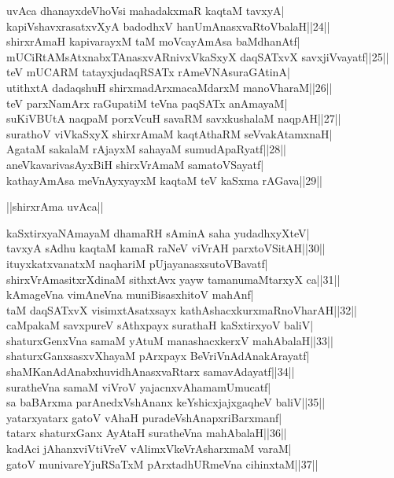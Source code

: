 \documentclass{article}
\begin{document}
uvAca dhanayxdeVhoVsi mahadakxmaR kaqtaM tavxyA|\\
kapiVshavxrasatxvXyA badodhxV hanUmAnasxvaRtoVbalaH||24||\\
shirxrAmaH kapivarayxM taM moVcayAmAsa baMdhanAtf|\\
mUCiRtAMsAtxnabxTAnasxvARnivxVkaSxyX daqSATxvX savxjiVvayatf||25||\\
teV mUCARM tatayxjudaqRSATx rAmeVNAsuraGAtinA|\\
utithxtA dadaqshuH shirxmadArxmacaMdarxM manoVharaM||26||\\
teV parxNamArx raGupatiM teVna paqSATx anAmayaM|\\
suKiVBUtA naqpaM porxVcuH savaRM savxkushalaM naqpAH||27||\\
surathoV viVkaSxyX shirxrAmaM kaqtAthaRM seVvakAtamxnaH|\\
AgataM sakalaM rAjayxM sahayaM sumudApaRyatf||28||\\
aneVkavarivasAyxBiH shirxVrAmaM samatoVSayatf|\\
kathayAmAsa meVnAyxyayxM kaqtaM teV kaSxma rAGava||29||\\

\begin{center}
||shirxrAma uvAca||
\end{center}

kaSxtirxyaNAmayaM dhamaRH sAminA saha yudadhxyXteV|\\
tavxyA sAdhu kaqtaM kamaR raNeV viVrAH parxtoVSitAH||30||\\
ituyxkatxvanatxM naqhariM pUjayanasxsutoVBavatf|\\
shirxVrAmasitxrXdinaM sithxtAvx yayw tamanumaMtarxyX ca||31||\\
kAmageVna vimAneVna muniBisasxhitoV mahAnf|\\
taM daqSATxvX visimxtAsatxsayx kathAshacxkurxmaRnoVharAH||32||\\
caMpakaM savxpureV sAthxpayx surathaH kaSxtirxyoV baliV|\\
shaturxGenxVna samaM yAtuM manashacxkerxV mahAbalaH||33||\\
shaturxGanxsasxvXhayaM pArxpayx BeVriVnAdAnakArayatf|\\
shaMKanAdAnabxhuvidhAnasxvaRtarx samavAdayatf||34||\\
suratheVna samaM viVroV yajacnxvAhamamUmucatf|\\
sa baBArxma parAnedxVshAnanx keYshicxjajxgaqheV baliV||35||\\
yatarxyatarx gatoV vAhaH puradeVshAnapxriBarxmanf|\\
tatarx shaturxGanx AyAtaH suratheVna mahAbalaH||36||\\
kadAci jAhanxviVtiVreV vAlimxVkeVrAsharxmaM varaM|\\
gatoV munivareYjuRSaTxM pArxtadhURmeVna cihinxtaM||37||\\
\end{document}
